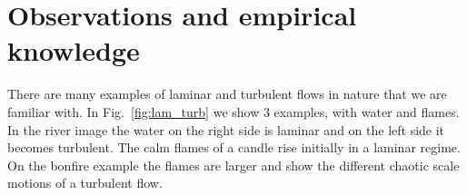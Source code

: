     

\graphicspath{{imgs/} {imgs/lam_turb} {imgs/spec}}

\section{Observations and empirical knowledge}

There are many examples of laminar and turbulent flows in nature that we are familiar with. In Fig.~\ref{fig:lam_turb} we show 3 examples, with water and flames. In the river image the water on the right side is laminar and on the left side it becomes turbulent. The calm flames of a candle rise initially in a laminar regime. On the bonfire example the flames are larger and show the different chaotic scale motions of a turbulent flow.

